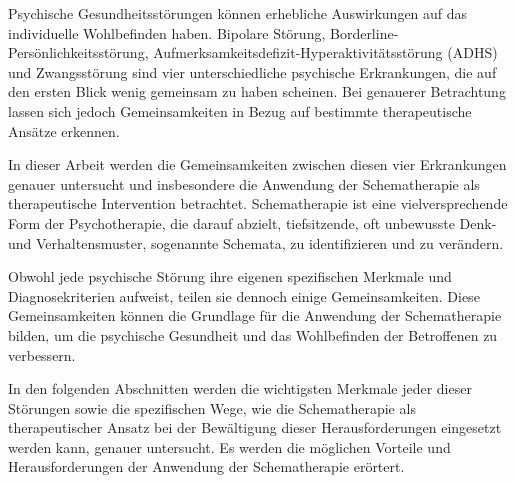 Psychische Gesundheitsstörungen können erhebliche Auswirkungen auf das individuelle Wohlbefinden haben. Bipolare Störung, Borderline-Persönlichkeitsstörung, Aufmerksamkeitsdefizit-Hyperaktivitätsstörung (ADHS) und Zwangsstörung sind vier unterschiedliche psychische Erkrankungen, die auf den ersten Blick wenig gemeinsam zu haben scheinen. Bei genauerer Betrachtung lassen sich jedoch Gemeinsamkeiten in Bezug auf bestimmte therapeutische Ansätze erkennen.

In dieser Arbeit werden die Gemeinsamkeiten zwischen diesen vier Erkrankungen genauer untersucht und insbesondere die Anwendung der Schematherapie als therapeutische Intervention betrachtet. Schematherapie ist eine vielversprechende Form der Psychotherapie, die darauf abzielt, tiefsitzende, oft unbewusste Denk- und Verhaltensmuster, sogenannte Schemata, zu identifizieren und zu verändern.

Obwohl jede psychische Störung ihre eigenen spezifischen Merkmale und Diagnosekriterien aufweist, teilen sie dennoch einige Gemeinsamkeiten. Diese Gemeinsamkeiten können die Grundlage für die Anwendung der Schematherapie bilden, um die psychische Gesundheit und das Wohlbefinden der Betroffenen zu verbessern.

In den folgenden Abschnitten werden die wichtigsten Merkmale jeder dieser Störungen sowie die spezifischen Wege, wie die Schematherapie als therapeutischer Ansatz bei der Bewältigung dieser Herausforderungen eingesetzt werden kann, genauer untersucht. Es werden die möglichen Vorteile und Herausforderungen der Anwendung der Schematherapie erörtert.